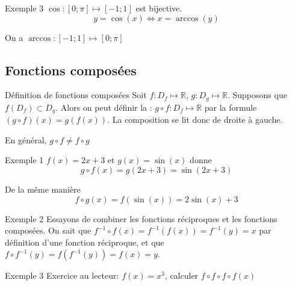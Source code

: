 \documentclass{article}
\begin{document}
\begin{parag}{Exemple 3}
    $\cos: \left[0; \pi\right] \mapsto \left[-1;1\right]$ est bijective.
    \[y = \cos\left(x\right) \iff x = \arccos\left(y\right)\]

    On a $\arccos: \left[-1;1\right] \mapsto \left[0;\pi\right]$
\end{parag}

\begin{parag}{}
\end{parag}


\subsection{Fonctions composées}
\begin{parag}{Définition de fonctions composées}
    Soit $f: D_f \mapsto \mathbb{R}$, $g: D_g \mapsto \mathbb{R}$. Supposons que $f\left(D_f\right) \subset D_g$. Alors on peut définir la : $g \circ f: D_f \mapsto \mathbb{R}$ par la formule $\left(g \circ f\right)\left(x\right) = g\left(f\left(x\right)\right)$. La composition se lit donc de droite à gauche. 

    En général, $g \circ f \neq f \circ g$
\end{parag}

\begin{parag}{Exemple 1}
    $f\left(x\right) = 2x + 3$ et $g\left(x\right) = \sin\left(x\right)$ donne 
    \[g \circ f\left(x\right) = g\left(2x + 3\right) = \sin\left(2x + 3\right)\]
    
    De la même manière 
    \[f \circ g\left(x\right) = f\left(\sin\left(x\right)\right) = 2\sin\left(x\right) + 3\]
\end{parag}

\begin{parag}{Exemple 2}
    Essayons de combiner les fonctions réciproques et les fonctions composées. On sait que $f^{-1} \circ f\left(x\right) = f^{-1}\left(f\left(x\right)\right) = f^{-1}\left(y\right) = x$ par définition d'une fonction réciproque, et que $f \circ f^{-1}\left(y\right) = f\left(f^{-1}\left(y\right)\right) = f\left(x\right) = y$. 
\end{parag}

\begin{parag}{Exemple 3}
    Exercice au lecteur: $f\left(x\right) = x^3$, calculer $f\circ f \circ f \circ f\left(x\right)$
\end{parag}
\end{document}
